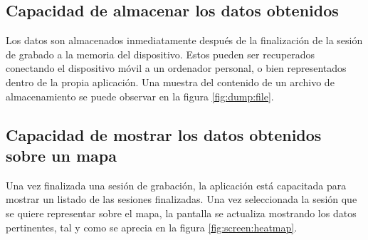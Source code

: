 \subsection{Capacidad de almacenar los datos obtenidos}
    Los datos son almacenados inmediatamente después de la finalización de la sesión de grabado a la memoria del dispositivo. Estos pueden ser recuperados conectando el dispositivo móvil a un ordenador personal, o bien representados dentro de la propia aplicación. Una muestra del contenido de un archivo de almacenamiento se puede observar en la figura \ref{fig:dump:file}.

\subsection{Capacidad de mostrar los datos obtenidos sobre un mapa}
    Una vez finalizada una sesión de grabación, la aplicación está capacitada para mostrar un listado de las sesiones finalizadas. Una vez seleccionada la sesión que se quiere representar sobre el mapa, la pantalla se actualiza mostrando los datos pertinentes, tal y como se aprecia en la figura \ref{fig:screen:heatmap}.

\chapterend{}